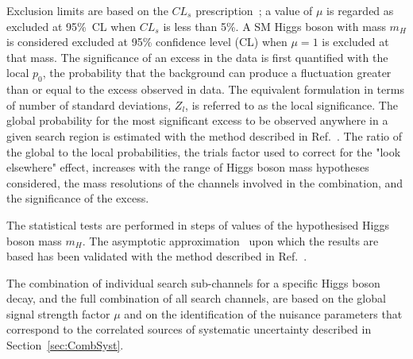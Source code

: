 \documentclass[final,3p,times,twocolumn]{elsarticle}
\newcommand{\mh}{\ensuremath{m_{H}}}
\begin{document}
Exclusion limits are based on the $CL_s$
prescription~\cite{Read:2002hq}; a value of $\mu$ is regarded as
excluded at 95\%~CL when $CL_s$ is less than 5\%.  A SM Higgs boson
with mass $\mh$ is considered excluded at 95\% confidence level (CL) when $\mu=1$ is
excluded at that mass.  The significance of an excess in the data is
first quantified with the local $p_0$, 
the probability that the background can produce a fluctuation greater than or
equal to the excess observed in data.
The equivalent formulation in terms of number of standard
deviations, $Z_l$, is referred to as the local significance. 
%
%
The global probability for the most significant excess to be observed 
anywhere in a given search region  is estimated with the method described in 
Ref.~\cite{Gross:2010qma}. The ratio of the global to the local probabilities, 
the trials factor used to correct for the "look elsewhere" effect, increases 
with the range of Higgs boson mass hypotheses considered, the mass resolutions 
of the channels involved in the combination, and the significance of the excess.

The statistical tests are
performed in steps of values of the hypothesised Higgs boson mass
$m_H$.
The asymptotic approximation~\cite{Cowan:2010st} upon which the results are
based has been validated with the method described in Ref.~\cite{paper2012prd}.

The combination of individual search sub-channels for a specific Higgs
boson decay, and the full combination of all search channels, are based
on the global signal strength factor $\mu$ and on the identification of
the nuisance parameters that correspond to the correlated sources of
systematic uncertainty described in Section~\ref{sec:CombSyst}.


\end{document}
